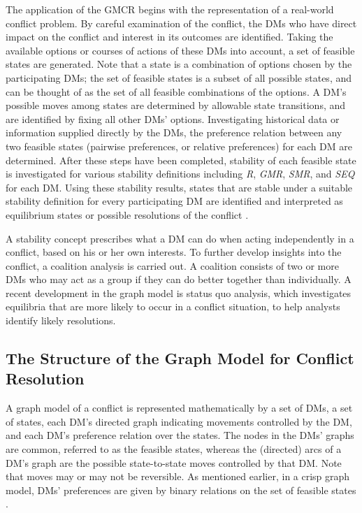 The application of the GMCR begins with the representation of a real-world conflict problem. By careful examination of the conflict, the DMs who have direct impact on the conflict and interest in its outcomes are identified. Taking the available options or courses of actions of these DMs into account, a set of feasible states are generated. Note that a state is a combination of options chosen by the participating DMs; the set of feasible states is a subset of all possible states, and can be thought of as the set of all feasible combinations of the options. A DM's possible moves among states are determined by allowable state transitions, and are identified by fixing all other DMs' options. Investigating historical data or information supplied directly by the DMs, the preference relation between any two feasible states (pairwise preferences, or relative preferences) for each DM are determined. After these steps have been completed, stability of each feasible state is investigated for various stability definitions including \emph{R}, \emph{GMR}, \emph{SMR}, and \emph{SEQ} for each DM. Using these stability results, states that are stable under a suitable stability definition for every participating DM are identified and interpreted as equilibrium states or possible resolutions of the conflict \citep{Fang-et-al1993}.

A stability concept prescribes what a DM can do when acting independently in a conflict, based on his or her own interests. To further develop insights into the conflict, a coalition analysis is carried out. A coalition consists of two or more DMs who may act as a group if they can do better together than individually. A recent development in the graph model is status quo analysis, which investigates equilibria that are more likely to occur in a conflict situation, to help analysts identify likely resolutions.

\subsection{The Structure of the Graph Model for Conflict Resolution}

A graph model of a conflict is represented mathematically by a set of DMs, a set of states, each DM's directed graph indicating movements controlled by the DM, and each DM's preference relation over the states. The nodes in the DMs' graphs are common, referred to as the feasible states, whereas the (directed) arcs of a DM's graph are the possible state-to-state moves controlled by that DM. Note that moves may or may not be reversible. As mentioned earlier, in a crisp graph model, DMs' preferences are given by binary relations on the set of feasible states \citep{Fang-et-al1993, Kilgour-et-al1987}.

